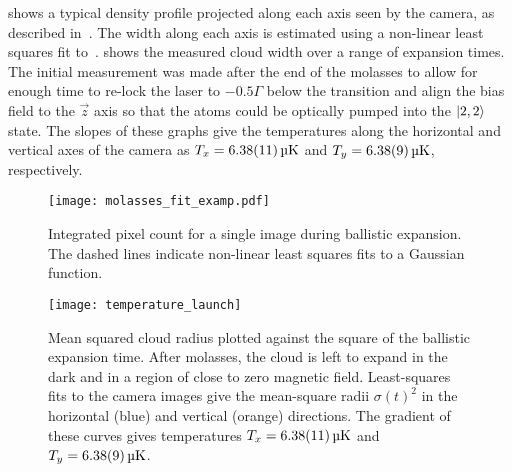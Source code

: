 \par\noindent
{} shows a typical density
profile projected along each axis seen by the camera,
as described in~. The width along each
axis is estimated using a non-linear least squares fit
to~.
 shows the measured cloud width
over a range of expansion times. The
initial measurement was made  after the end
of the molasses to allow for enough time to re-lock the laser to
\(-0.5\Gamma\) below the  transition and align the bias
field to the \(\vec{z}\) axis so that the atoms could be optically
pumped into the \(\ket{2,2}\) state. 
The slopes of these graphs give the temperatures along the horizontal and vertical axes of the
camera as \(T_x = \sivalue{6.38 \pm 0.11}{\micro\kelvin}\) and \(T_y =
\sivalue{6.38 \pm 0.09}{\micro\kelvin}\), respectively.  
\begin{figure}[htpb]
  \centering
  \texttt{[image: molasses\_fit\_examp.pdf]}
  \caption[Integrated pixel counts during ballistic expansion.]{Integrated pixel count for a single image during ballistic
    expansion. The dashed lines indicate non-linear least squares fits
  to a Gaussian function.}
  \label{fig:molasses_fit_examp}
\end{figure}
\begin{figure}[!htbp]
  \centering
  \texttt{[image: temperature\_launch]}
  \caption[Temperature measurement using ballistic expansion]{Mean
    squared cloud radius plotted against the square of the ballistic
    expansion time. After
    molasses, the cloud is left to expand in the dark and in a region of
    close to zero magnetic field. Least-squares fits to the camera
    images give the mean-square radii $\sigma(t)^2$ in the horizontal
    (blue) and vertical (orange) directions. 
    The gradient of these curves gives temperatures \(T_x = \sivalue{6.38 \pm0.11}{\micro\kelvin}\) and \(T_y =
  \sivalue{6.38\pm0.09}{\micro\kelvin}\).}
  \label{fig:molasses_temperature}
\end{figure}

